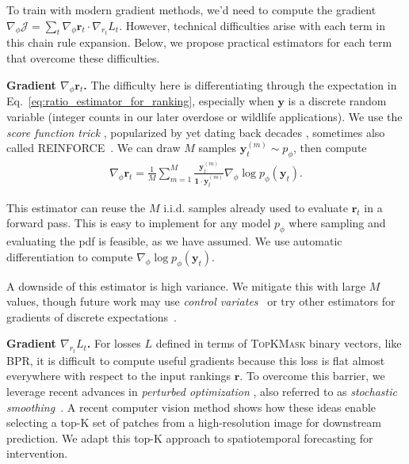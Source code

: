 To train with modern gradient methods, we'd need to compute the gradient $\nabla_{\phi} \mathcal{J} = \sum_t \nabla_{\phi} \bm{r}_t \cdot \nabla_{r_t} L_t$. 
However, technical difficulties arise with each term in this chain rule expansion. Below, we propose practical estimators for each term that overcome these difficulties. 

\textbf{Gradient $\nabla_{\phi} \bm{r}_t$.} The difficulty here is differentiating through the expectation in Eq.~\eqref{eq:ratio_estimator_for_ranking}, especially when $\bm{y}$ is a discrete random variable (integer counts in our later overdose or wildlife applications). We use the \emph{score function trick} \citep{mohamed2020MonteCarloGradient}, popularized by \citet{ranganath2014BBVI} yet dating back decades \citep{kleijnen1996OptimizationScoreFunction}, sometimes also called REINFORCE~\citep{williams1992reinforce}.
We can draw $M$ samples $\bm{y}^{(m)}_t \sim p_{\phi}$, then compute
\begin{align}
\nabla_{\phi} \bm{r}_t = \frac{1}{M} \sum_{m=1}^M \frac{ \bm{y}_t^{(m)} }{ \bm{1} \cdot \bm{y}_t^{(m)}} \nabla_{\phi} \log p_{\phi}( \bm{y}_t ).
\label{eq:grad_r_wrt_phi}
\end{align}

This estimator can reuse the $M$ i.i.d. samples already used to evaluate $\bm{r}_t$ in a forward pass. This is easy to implement for any model $p_{\phi}$ where sampling and evaluating the pdf is feasible, as we have assumed. We use automatic differentiation to compute $\nabla_{\phi} \log p_{\phi}(\bm{y}_t)$.

A downside of this estimator is high variance. We mitigate this with large $M$ values, though future work may use \emph{control variates}~\citep{ranganath2014BBVI,mohamed2020MonteCarloGradient} or try other estimators for gradients of discrete expectations~\citep{maddison2017Concrete,dimitriev2021CARMS}.


\textbf{Gradient $\nabla_{r_t} L_t$.}
For losses $L$ defined in terms of \textsc{TopKMask} binary vectors, like BPR, it is difficult to compute useful gradients because this loss is flat almost everywhere with respect to the input rankings $\bm{r}$. To overcome this barrier, we leverage recent advances in \emph{perturbed optimization} \citep{berthetLearningDifferentiablePerturbed2020}, also referred to as \emph{stochastic smoothing}~\citep{abernethyPerturbationTechniquesOnline2016}.
A recent computer vision method 
\citep{cordonnierDifferentiablePatchSelection2021} shows how these ideas enable selecting a top-K set of patches from a high-resolution image for downstream prediction. We adapt this top-K approach to spatiotemporal forecasting for intervention.

